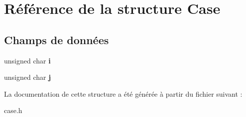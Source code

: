 \hypertarget{structCase}{
\section{Référence de la structure Case}
\label{structCase}
}
\subsection*{Champs de données}
\begin{DoxyCompactItemize}
\item 
\hypertarget{structCase_aa153db46def2bd44f5e438a0f5695779}{
unsigned char {\bfseries i}}
\label{structCase_aa153db46def2bd44f5e438a0f5695779}

\item 
\hypertarget{structCase_aa29567a6d5b6753ecf7cff4567a77e1e}{
unsigned char {\bfseries j}}
\label{structCase_aa29567a6d5b6753ecf7cff4567a77e1e}

\end{DoxyCompactItemize}


La documentation de cette structure a été générée à partir du fichier suivant :\begin{DoxyCompactItemize}
\item 
case.h\end{DoxyCompactItemize}
